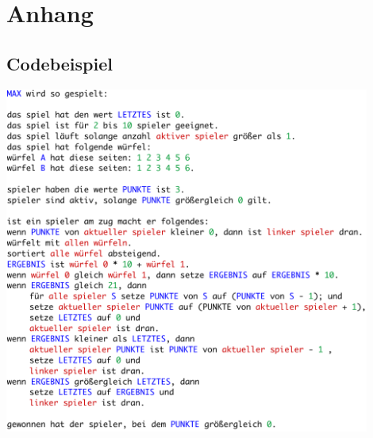 
\chapter{Anhang} %
\label{cha:anhang}

\section{Codebeispiel} %
\label{sec:codebeispiel}
\includegraphics[width=0.9\textwidth]{example-code-crop.pdf}
\newpage
